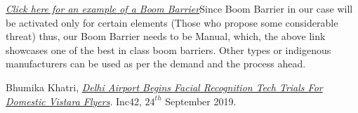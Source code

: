 \documentclass[a4paper,11pt]{article}
\begin{document}
\begin{thebibliography}{9}
\textit{\href{https://www.shop.toshiautomation.com/product/detail/auto-boom-barrier-4-meter?gclid=Cj0KCQjwoKzsBRC5ARIsAITcwXFyCGsABUKta0HFSZRqa32vFrCnRop7TgHqRWi4hC4mPTXo-3gFVKwaArkiEALw_wcB}{Click here for an example of a Boom Barrier}}\newline Since Boom Barrier in our case will be activated only for certain elements (Those who propose some considerable threat) thus, our Boom Barrier needs to be Manual, which, the above link showcases one of the best in class boom barriers. Other types or indigenous manufacturers can be used as per the demand and the process ahead.

Bhumika Khatri, \textit{\href{https://inc42.com/buzz/delhi-airport-to-enable-facial-recognition-tech-under-digiyatra/}{Delhi Airport Begins Facial Recognition Tech Trials For Domestic Vistara Flyers}}. Inc42, $24^{th}$ September 2019.
\end{thebibliography}
\end{document}
